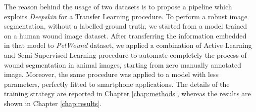 \documentclass[../main.tex]{subfiles}
\begin{document}
The reason behind the usage of two datasets is to propose a pipeline which exploits \textit{Deepskin} for a Transfer Learning procedure.
To perform a robust image segmentation, without a labelled ground truth, we started from a model trained on a human wound image dataset.
After transferring the information embedded in that model to \textit{PetWound} dataset, we applied a combination of Active Learning and Semi-Supervised Learning procedure to automate completely the process of wound segmentation in animal images, starting from zero manually annotated image.
Moreover, the same procedure was applied to a model with less parameters, perfectly fitted to smartphone applications. 
The details of the training strategy are reported in Chapter \ref{chap:methods}, whereas the results are shown in Chapter \ref{chap:results}.
\end{document}
